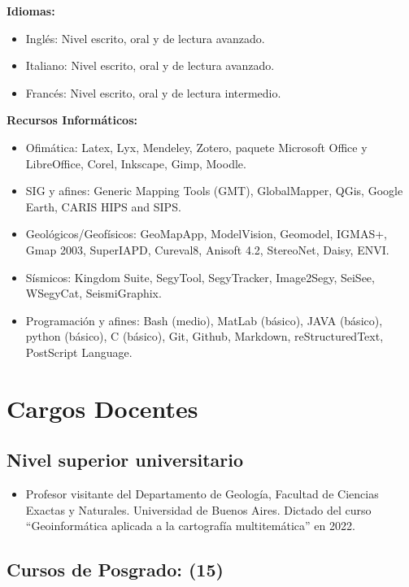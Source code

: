\documentclass[11pt, a4paper]{article}
\begin{document}
\textbf{Idiomas:}

\begin{itemize}
    \item Inglés: Nivel escrito, oral y de lectura avanzado.
    \item Italiano: Nivel escrito, oral y de lectura avanzado.
    \item Francés: Nivel escrito, oral y de lectura intermedio.
\end{itemize}

\textbf{Recursos Informáticos:}

\begin{itemize}
    \item Ofimática: Latex, Lyx, Mendeley, Zotero, paquete Microsoft Office y LibreOffice, Corel, Inkscape, Gimp, Moodle.
    \item SIG y afines: Generic Mapping Tools (GMT), GlobalMapper, QGis, Google Earth, CARIS HIPS and SIPS.
    \item Geológicos/Geofísicos: GeoMapApp, ModelVision, Geomodel, IGMAS+, Gmap 2003, SuperIAPD, Cureval8, Anisoft 4.2, StereoNet, Daisy, ENVI.
    \item Sísmicos: Kingdom Suite, SegyTool, SegyTracker, Image2Segy, SeiSee, WSegyCat, SeismiGraphix.
    \item Programación y afines: Bash (medio), MatLab (básico), JAVA (básico), python (básico), C (básico), Git, Github, Markdown, reStructuredText, PostScript Language.
\end{itemize}


\section{Cargos Docentes}


\subsection{Nivel superior universitario}

\begin{itemize}
    \item Profesor visitante del Departamento de Geología, Facultad de Ciencias Exactas y Naturales. Universidad de Buenos Aires. Dictado del curso “Geoinformática aplicada a la cartografía multitemática” en 2022.
\end{itemize}


\subsection{Cursos de Posgrado: (15)}
\end{document}
